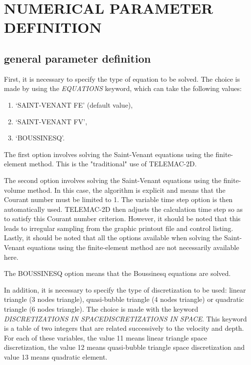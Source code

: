 

\chapter{  NUMERICAL PARAMETER DEFINITION}


\section{ general parameter definition}

 First, it is necessary to specify the type of equation to be solved. The choice is made by using the \textit{EQUATIONS} keyword, which can take the following values:

\begin{enumerate}
\item  `SAINT-VENANT FE' (default value),

\item  `SAINT-VENANT FV',

\item  `BOUSSINESQ'.
\end{enumerate}

 The first option involves solving the Saint-Venant equations using the finite-element method. This is the "traditional" use of TELEMAC-2D.

 The second option involves solving the Saint-Venant equations using the finite-volume method. In this case, the algorithm is explicit and means that the Courant number must be limited to 1. The variable time step option is then automatically used. TELEMAC-2D then adjusts the calculation time step so as to satisfy this Courant number criterion. However, it should be noted that this leads to irregular sampling from the graphic printout file and control listing. Lastly, it should be noted that all the options available when solving the Saint-Venant equations using the finite-element method are not necessarily available here.

 The BOUSSINESQ option means that the Boussinesq equations are solved.

 In addition, it is necessary to specify the type of discretization to be used: linear triangle (3 nodes triangle), quasi-bubble triangle (4 nodes triangle) or quadratic triangle (6 nodes triangle). The choice is made with the keyword \textit{DISCRETIZATIONS IN SPACEDISCRETIZATIONS IN SPACE}. This keyword is a table of two integers that are related successively to the velocity and depth. For each of these variables, the value 11 means linear triangle space discretization, the value 12 means quasi-bubble triangle space discretization and value 13 means quadratic element.

